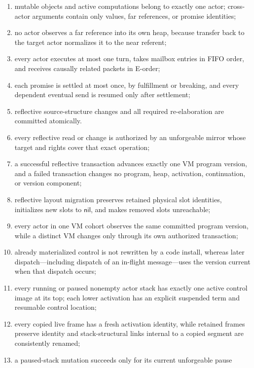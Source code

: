 \documentclass[11pt]{article}
\numberwithin{equation}{section}
\newcommand{\kw}[1]{\ensuremath{\mathsf{#1}}}
\newcommand{\nil}{\kw{nil}}
\begin{document}
\begin{enumerate}
      failure inside the chosen DNU body is an ordinary new computation;
\item mutable objects and active computations belong to exactly one actor;
      cross-actor arguments contain only values, far references, or promise
      identities;
\item no actor observes a far reference into its own heap, because transfer
      back to the target actor normalizes it to the near referent;
\item every actor executes at most one turn, takes mailbox entries in FIFO
      order, and receives causally related packets in E-order;
\item each promise is settled at most once, by fulfillment or breaking, and
      every dependent eventual send is resumed only after settlement;
\item reflective source-structure changes and all required re-elaboration are
      committed atomically.
\item every reflective read or change is authorized by an unforgeable mirror
      whose target and rights cover that exact operation;
\item a successful reflective transaction advances exactly one VM program
      version, and a failed transaction changes no program, heap, activation,
      continuation, or version component;
\item reflective layout migration preserves retained physical slot identities,
      initializes new slots to $\nil$, and makes removed slots unreachable;
\item every actor in one VM cohort observes the same committed program version,
      while a distinct VM changes only through its own authorized transaction;
\item already materialized control is not rewritten by a code install, whereas
      later dispatch---including dispatch of an in-flight message---uses the
      version current when that dispatch occurs;
\item every running or paused nonempty actor stack has exactly one active
      control image at its top; each lower activation has an explicit suspended
      term and resumable control location;
\item every copied live frame has a fresh activation identity, while retained
      frames preserve identity and stack-structural links internal to a copied
      segment are consistently renamed;
\item a paused-stack mutation succeeds only for its current unforgeable pause

\end{enumerate}
\end{document}
